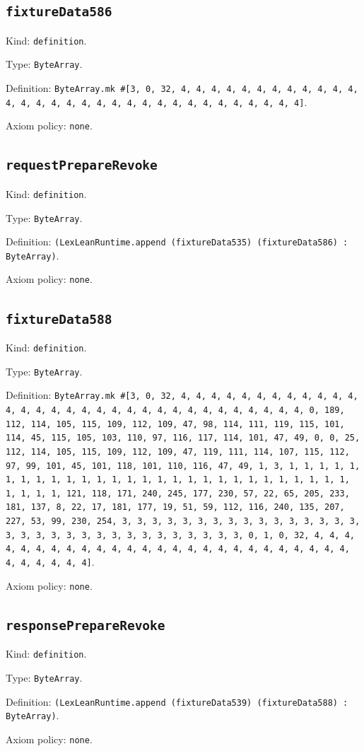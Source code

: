 \documentclass[11pt]{article}
\begin{document}
\subsection*{\texttt{fixtureData586}}
\noindent Kind: \texttt{definition}.\par
\noindent Type: \texttt{ByteArray}.\par
\noindent Definition: \texttt{ByteArray.mk \#[3, 0, 32, 4, 4, 4, 4, 4, 4, 4, 4, 4, 4, 4, 4, 4, 4, 4, 4, 4, 4, 4, 4, 4, 4, 4, 4, 4, 4, 4, 4, 4, 4, 4, 4]}.\par
\noindent Axiom policy: \texttt{none}.\par
\subsection*{\texttt{requestPrepareRevoke}}
\noindent Kind: \texttt{definition}.\par
\noindent Type: \texttt{ByteArray}.\par
\noindent Definition: \texttt{(LexLeanRuntime.append (fixtureData535) (fixtureData586) : ByteArray)}.\par
\noindent Axiom policy: \texttt{none}.\par
\subsection*{\texttt{fixtureData588}}
\noindent Kind: \texttt{definition}.\par
\noindent Type: \texttt{ByteArray}.\par
\noindent Definition: \texttt{ByteArray.mk \#[3, 0, 32, 4, 4, 4, 4, 4, 4, 4, 4, 4, 4, 4, 4, 4, 4, 4, 4, 4, 4, 4, 4, 4, 4, 4, 4, 4, 4, 4, 4, 4, 4, 4, 4, 0, 189, 112, 114, 105, 115, 109, 112, 109, 47, 98, 114, 111, 119, 115, 101, 114, 45, 115, 105, 103, 110, 97, 116, 117, 114, 101, 47, 49, 0, 0, 25, 112, 114, 105, 115, 109, 112, 109, 47, 119, 111, 114, 107, 115, 112, 97, 99, 101, 45, 101, 118, 101, 110, 116, 47, 49, 1, 3, 1, 1, 1, 1, 1, 1, 1, 1, 1, 1, 1, 1, 1, 1, 1, 1, 1, 1, 1, 1, 1, 1, 1, 1, 1, 1, 1, 1, 1, 1, 1, 1, 121, 118, 171, 240, 245, 177, 230, 57, 22, 65, 205, 233, 181, 137, 8, 22, 17, 181, 177, 19, 51, 59, 112, 116, 240, 135, 207, 227, 53, 99, 230, 254, 3, 3, 3, 3, 3, 3, 3, 3, 3, 3, 3, 3, 3, 3, 3, 3, 3, 3, 3, 3, 3, 3, 3, 3, 3, 3, 3, 3, 3, 3, 3, 3, 0, 1, 0, 32, 4, 4, 4, 4, 4, 4, 4, 4, 4, 4, 4, 4, 4, 4, 4, 4, 4, 4, 4, 4, 4, 4, 4, 4, 4, 4, 4, 4, 4, 4, 4, 4]}.\par
\noindent Axiom policy: \texttt{none}.\par
\subsection*{\texttt{responsePrepareRevoke}}
\noindent Kind: \texttt{definition}.\par
\noindent Type: \texttt{ByteArray}.\par
\noindent Definition: \texttt{(LexLeanRuntime.append (fixtureData539) (fixtureData588) : ByteArray)}.\par
\noindent Axiom policy: \texttt{none}.\par
\end{document}
